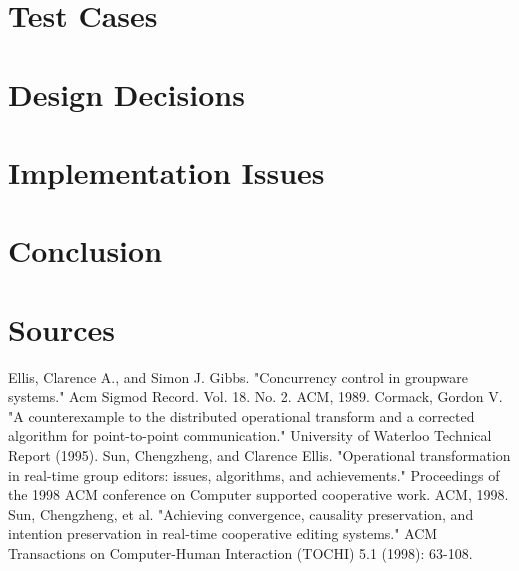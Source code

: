 \documentclass{article}
\begin{document}
\section{Test Cases}


\section{Design Decisions}

\section{Implementation Issues}

\section{Conclusion}

\section{Sources}
\begin{enum}
  \list Ellis, Clarence A., and Simon J. Gibbs. "Concurrency control in groupware systems." Acm Sigmod Record. Vol. 18. No. 2. ACM, 1989.
  \list Cormack, Gordon V. "A counterexample to the distributed operational transform and a corrected algorithm for point-to-point communication." University of Waterloo Technical Report (1995).
  \list Sun, Chengzheng, and Clarence Ellis. "Operational transformation in real-time group editors: issues, algorithms, and achievements." Proceedings of the 1998 ACM conference on Computer supported cooperative work. ACM, 1998.
  \list Sun, Chengzheng, et al. "Achieving convergence, causality preservation, and intention preservation in real-time cooperative editing systems." ACM Transactions on Computer-Human Interaction (TOCHI) 5.1 (1998): 63-108.
\end{enum}
\end{document}
